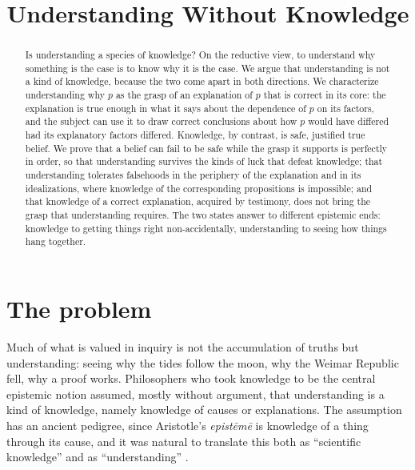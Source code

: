 \documentclass{situationist-preprint}
\title{Understanding Without Knowledge}
\begin{document}
\maketitle

\begin{abstract}
Is understanding a species of knowledge? On the reductive view, to understand why something is the case is to know why it is the case. We argue that understanding is not a kind of knowledge, because the two come apart in both directions. We characterize understanding why $p$ as the grasp of an explanation of $p$ that is correct in its core: the explanation is true enough in what it says about the dependence of $p$ on its factors, and the subject can use it to draw correct conclusions about how $p$ would have differed had its explanatory factors differed. Knowledge, by contrast, is safe, justified true belief. We prove that a belief can fail to be safe while the grasp it supports is perfectly in order, so that understanding survives the kinds of luck that defeat knowledge; that understanding tolerates falsehoods in the periphery of the explanation and in its idealizations, where knowledge of the corresponding propositions is impossible; and that knowledge of a correct explanation, acquired by testimony, does not bring the grasp that understanding requires. The two states answer to different epistemic ends: knowledge to getting things right non-accidentally, understanding to seeing how things hang together.
\end{abstract}

\section{The problem}

Much of what is valued in inquiry is not the accumulation of truths but understanding: seeing why the tides follow the moon, why the Weimar Republic fell, why a proof works. Philosophers who took knowledge to be the central epistemic notion assumed, mostly without argument, that understanding is a kind of knowledge, namely knowledge of causes or explanations. The assumption has an ancient pedigree, since Aristotle's \emph{epist\=em\=e} is knowledge of a thing through its cause, and it was natural to translate this both as \enquote{scientific knowledge} and as \enquote{understanding} \citep{Burnyeat1981}.
\end{document}
